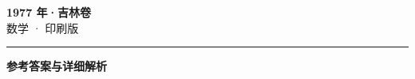 \documentclass[zihao=5, a4paper]{ctexart}
\begin{document}
\begin{center}
  {\Large\bfseries 1977 年·吉林卷}\\[4pt]
  {\large 数学 · 印刷版}
\end{center}
\medskip
{}

\par\bigskip\hrule\bigskip
{}
\begin{center}{\large\bfseries 参考答案与详细解析}\end{center}
\smallskip

\end{document}
